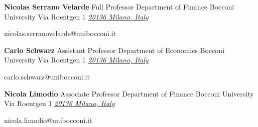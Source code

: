 \documentclass{scrartcl}
\newcommand{\MarginText}[1]{\marginpar{\raggedleft\itshape\small#1}} %
\newcommand{\Description}[1]{\hangindent=2em\hangafter=0\noindent\raggedright\footnotesize{#1}\par\normalsize\vspace{1em}} %
\newcommand{\cvreference}[6]{%
    \textbf{#1}\newline%
    #2\newline%
    #3\newline%
    #4\newline%
    #5\newline%
    \textit{\href{mailto:#6}{#6}\newline%
    }%
}
\begin{document}
\begin{cv}{}







\vspace{1em}

\begin{minipage}[t]{0.45\textwidth}
    \footnotesize %
    \cvreference{Nicolas Serrano Velarde}
        {Full Professor}
        {Department of Finance}
        {Bocconi University}
        {Via Roentgen 1}
        {20136 Milano, Italy}
        {nicolas.serranovelarde@unibocconi.it}\\[1em]
\end{minipage}\hfill %
\begin{minipage}[t]{0.45\textwidth}
    \footnotesize %
    \cvreference{Carlo Schwarz}
        {Assistant Professor}
        {Department of Economics}
        {Bocconi University}
        {Via Roentgen 1}
        {20136 Milano, Italy}
        {carlo.schwarz@unibocconi.it}
\end{minipage}

{\footnotesize %
\cvreference{Nicola Limodio}
        {Associate Professor}
        {Department of Finance}
        {Bocconi University}
        {Via Roentgen 1}
        {20136 Milano, Italy}
        {nicola.limodio@unibocconi.it}\\[1em]
} %












\end{cv}
\end{document}
